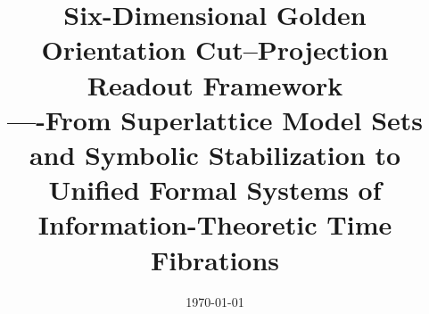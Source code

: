 \documentclass[11pt,letterpaper]{article}
\title{Six-Dimensional Golden Orientation Cut--Projection Readout Framework\\\large ----From Superlattice Model Sets and Symbolic Stabilization to Unified Formal Systems of Information-Theoretic Time Fibrations}
\author{}
\date{\today}
\begin{document}
\maketitle















\FloatBarrier
\appendix


\FloatBarrier

\end{document}
